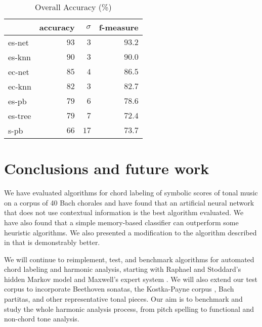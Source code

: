 \documentclass{article}
\begin{document}
\begin{table}
  \centering
  \begin{tabular}{l|rrr}
       & accuracy& $\sigma$  & f-measure\\
\hline
es-net &$   93  $&$  3$      &$93.2$ \\
es-knn &$   90  $&$  3$      &$90.0$ \\
ec-net &$   85  $&$  4$      &$86.5$ \\
ec-knn &$   82  $&$  3$      &$82.7$ \\
es-pb  &$   79  $&$  6$      &$78.6$ \\
es-tree&$   79  $&$  7$      &$72.4$ \\
s-pb   &$   66  $&$ 17$      &$73.7$ \\

  \end{tabular}                                                        


  \caption{Overall Accuracy (\%)}
  \label{tab:accuracy}
\end{table}

\section{Conclusions and future work}
\label{sec:conclusions}

We have evaluated algorithms for chord labeling of symbolic scores of
tonal music on a corpus of 40 Bach chorales and have found that an
artificial neural network that does not use contextual information is
the best algorithm evaluated. We have also found that a simple
memory-based classifier can outperform some heuristic algorithms. We
also presented a modification to the algorithm described in
\cite{barthelemy.ea01:figured} that is demonstrably better.

We will continue to reimplement, test, and benchmark algorithms for
automated chord labeling and harmonic analysis, starting with Raphael
and Stoddard's hidden Markov model \cite{raphael.ea03:harmonic} and
Maxwell's expert system \cite{maxwell92:expert}.  We will also extend
our test corpus to incorporate Beethoven sonatas, the Kostka-Payne
corpus \cite{temperley04:bayesian}, Bach partitas, and other
representative tonal pieces. Our aim is to benchmark and study the
whole harmonic analysis process, from pitch spelling to functional and
non-chord tone analysis.



\end{document}
